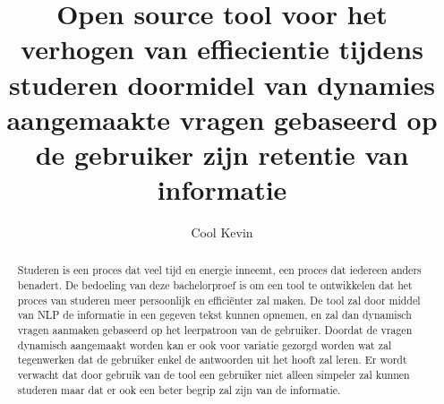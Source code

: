 \documentclass{hogent-article}
\title{Open source tool voor het verhogen van effiecientie tijdens studeren doormidel van dynamies aangemaakte vragen gebaseerd op de gebruiker zijn retentie van informatie }
\author{Cool Kevin}
\begin{document}
\begin{abstract}
 Studeren is een proces dat veel tijd en energie inneemt, een proces dat iedereen anders benadert. De bedoeling van deze bachelorproef is om een tool te ontwikkelen dat het proces van studeren meer persoonlijk en efficiënter zal maken. De tool zal door middel van NLP de informatie in een gegeven tekst kunnen opnemen, en zal dan dynamisch vragen aanmaken gebaseerd op het leerpatroon van de gebruiker. Doordat de vragen dynamisch aangemaakt worden kan er ook voor variatie gezorgd worden wat zal tegenwerken dat de gebruiker enkel de antwoorden uit het hooft zal leren. Er wordt verwacht dat door gebruik van de tool een gebruiker niet alleen simpeler zal kunnen studeren maar dat er ook een beter begrip zal zijn van de informatie.

\end{abstract}

\tableofcontents



\printbibliography[heading=bibintoc]
\end{document}
